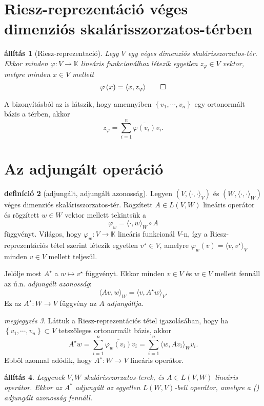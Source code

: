 \documentclass[9pt, a4paper, showtrims]{memoir}
\theoremstyle{plain}
\newtheorem{proposition}{állítás}[chapter]
\theoremstyle{remark}
\newtheorem{note}[proposition]{megjegyzés}
\theoremstyle{definition}
\newtheorem{definition}[proposition]{definíció}
\newcommand{\ip}[2]{\langle#1,#2\rangle}
\begin{document}
\section{Riesz-reprezentáció véges dimenziós skalárisszorzatos-térben}

\begin{proposition}[Riesz-reprezentació]
    Legy $V$ egy véges dimenziós skalárisszorzatos-tér.
    Ekkor minden $\varphi:V\to\mathbb{K}$ lineáris
    funkcionálhoz létezik egyetlen $z_\varphi\in V$ vektor,
    melyre minden $x\in V$ mellett
    \[
        \varphi\left( x \right)=\ip{x}{z_\varphi}
        \qedhere
    \]
\end{proposition}
A bizonyításból az is látszik, hogy amennyiben 
$\left\{ v_1,\cdots,v_n \right\}$ egy ortonormált bázis a térben, akkor
\[
    z_\varphi=
    \sum_{i=1}^n\overline{\varphi\left( v_i \right)}v_i.
\]


\section{Az adjungált operáció}
\begin{definition}[adjungált, adjungált azonosság]
Legyen $\left( V,\ip{\cdot}{\cdot}_V \right)$ és
$\left( W,\ip{\cdot}{\cdot}_W \right)$ véges dimenziós ska\-láris\-szor\-zatos-tér.
Rögzített $A\in L\left( V,W \right)$ lineáris operátor és rögzített $w\in W$ vektor mellett tekintsük a 
\[
    \varphi_w=
    \ip{\cdot}{w}_W\circ A
\]
függvényt. 
Világos, hogy $\varphi_w:V\to\mathbb{K}$ lineáris funkcionál $V$-n, 
így a Riesz-reprezentációs tétel szerint létezik egyetlen $v^\star\in V$, 
amelyre
$\varphi_w\left( v \right)=\ip{v}{v^\star}_V$ minden $v\in V$ mellett teljesül.

Jelölje most $A^\star$ a $w\mapsto v^\star$ függvényt. 
Ekkor minden $v\in V$ és $w\in V$ mellett fennáll az ú.n. \emph{adjungált azonosság}:
\[
    \ip{Av}{w}_W=\ip{v}{A^\star w}_V.\tag{\dag}
\]
Ez az $A^\star:W\to V$ függvény az $A$ \emph{adjungáltja}.
\end{definition}

\begin{note}
    Láttuk a Riesz-reprezentációs tétel igazolásában, hogy ha $\left\{ v_1,\cdots,v_n \right\}\subset V$
    tetszőleges ortonormált bázis, akkor 
    \[
        A^\star w=
        \sum_{i=1}^n\overline{\varphi_w\left( v_i \right)}v_i=
        \sum_{i=1}^n\ip{w}{Av_i}_Wv_i.
    \]
    Ebből azonnal adódik, hogy $A^\star:W\to V$ lineáris operátor.
\end{note}
\begin{proposition}
    Legyenek $V,W$ skalárisszorzatos-terek, és $A\in L\left( V,W \right)$ lineáris operátor.
    Ekkor az $A^\ast$ adjungált az egyetlen $L\left( W,V \right)$-beli operátor,
    amelyre a (\dag) adjungált azonosság fennáll.
\end{proposition}
\end{document}
